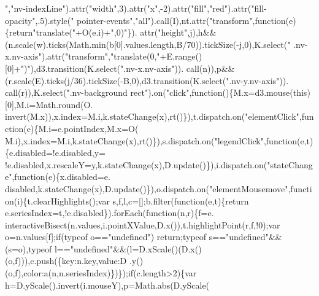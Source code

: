 \begin{DoxyCode}
{      "},\textcolor{stringliteral}{"nv-indexLine"}).attr(\textcolor{stringliteral}{"width"},3).attr(\textcolor{stringliteral}{"x"},-2).attr(\textcolor{stringliteral}{"fill"},\textcolor{stringliteral}{"red"}).attr(\textcolor{stringliteral}{"fill-opacity"},.5).style(\textcolor{stringliteral}{"
      pointer-events"},\textcolor{stringliteral}{"all"}).call(I),nt.attr(\textcolor{stringliteral}{"transform"},\textcolor{keyword}{function}(e)\{\textcolor{keywordflow}{return}\textcolor{stringliteral}{"translate("}+O(e.i)+\textcolor{stringliteral}{",0)"}\}).
      attr(\textcolor{stringliteral}{"height"},j),h&&(n.scale(w).ticks(Math.min(b[0].values.length,B/70)).tickSize(-j,0),K.select(\textcolor{stringliteral}{"
      .nv-x.nv-axis"}).attr(\textcolor{stringliteral}{"transform"},\textcolor{stringliteral}{"translate(0,"}+E.range()[0]+\textcolor{stringliteral}{")"}),d3.transition(K.select(\textcolor{stringliteral}{".nv-x.nv-axis"})).
      call(n)),p&&(r.scale(E).ticks(j/36).tickSize(-B,0),d3.transition(K.select(\textcolor{stringliteral}{".nv-y.nv-axis"})).
      call(r)),K.select(\textcolor{stringliteral}{".nv-background rect"}).on(\textcolor{stringliteral}{"click"},\textcolor{keyword}{function}()\{M.x=d3.mouse(\textcolor{keyword}{this})[0],M.i=Math.round(O.
      invert(M.x)),x.index=M.i,k.stateChange(x),rt()\}),t.dispatch.on(\textcolor{stringliteral}{"elementClick"},\textcolor{keyword}{function}(e)\{M.i=e.pointIndex,M.x=O(
      M.i),x.index=M.i,k.stateChange(x),rt()\}),s.dispatch.on(\textcolor{stringliteral}{"legendClick"},\textcolor{keyword}{function}(e,t)\{e.disabled=!e.disabled,y=
      !e.disabled,x.rescaleY=y,k.stateChange(x),D.update()\}),i.dispatch.on(\textcolor{stringliteral}{"stateChange"},\textcolor{keyword}{function}(e)\{x.disabled=e.
      disabled,k.stateChange(x),D.update()\}),o.dispatch.on(\textcolor{stringliteral}{"elementMousemove"},\textcolor{keyword}{function}(i)\{t.clearHighlights();var 
      s,f,l,c=[];b.filter(\textcolor{keyword}{function}(e,t)\{\textcolor{keywordflow}{return} e.seriesIndex=t,!e.disabled\}).forEach(\textcolor{keyword}{function}(n,r)\{f=e.
      interactiveBisect(n.values,i.pointXValue,D.x()),t.highlightPoint(r,f,!0);var o=n.values[f];\textcolor{keywordflow}{if}(typeof o==\textcolor{stringliteral}{"undefined"})\textcolor{keywordflow}{
      return};typeof s==\textcolor{stringliteral}{"undefined"}&&(s=o),typeof l==\textcolor{stringliteral}{"undefined"}&&(l=D.xScale()(D.x()(o,f))),c.push(\{key:n.key,value:D
      .y()(o,f),color:a(n,n.seriesIndex)\})\});\textcolor{keywordflow}{if}(c.length>2)\{var h=D.yScale().invert(i.mouseY),p=Math.abs(D.yScale(

\end{DoxyCode}
